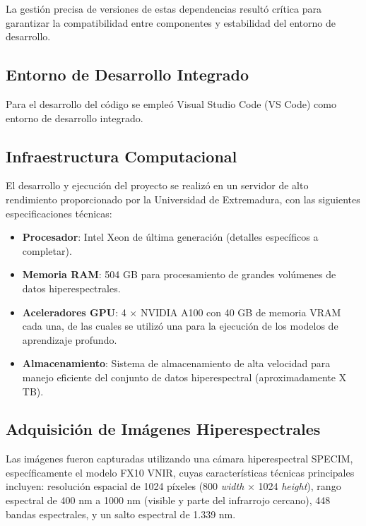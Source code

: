 La gestión precisa de versiones de estas dependencias resultó crítica para garantizar la compatibilidad entre componentes y estabilidad del entorno de desarrollo.

\subsection{Entorno de Desarrollo Integrado}

Para el desarrollo del código se empleó Visual Studio Code (VS Code) como entorno de desarrollo integrado.

\subsection{Infraestructura Computacional}

El desarrollo y ejecución del proyecto se realizó en un servidor de alto rendimiento proporcionado por la Universidad de Extremadura, con las siguientes especificaciones técnicas:

\begin{itemize}
    \item \textbf{Procesador}: Intel Xeon de última generación (detalles específicos a completar).
    \item \textbf{Memoria RAM}: 504 GB para procesamiento de grandes volúmenes de datos hiperespectrales.
    \item \textbf{Aceleradores GPU}: 4 × NVIDIA A100 con 40 GB de memoria VRAM cada una, de las cuales se utilizó una para la ejecución de los modelos de aprendizaje profundo.
    \item \textbf{Almacenamiento}: Sistema de almacenamiento de alta velocidad para manejo eficiente del conjunto de datos hiperespectral (aproximadamente X TB).
\end{itemize}

\subsection{Adquisición de Imágenes Hiperespectrales}

Las imágenes fueron capturadas utilizando una cámara hiperespectral SPECIM, específicamente el modelo FX10 VNIR, cuyas características técnicas principales incluyen: resolución espacial de 1024 píxeles (800 \emph{width} × 1024 \emph{height}), rango espectral de 400 nm a 1000 nm (visible y parte del infrarrojo cercano), 448 bandas espectrales, y un salto espectral de 1.339 nm.

\vspace{5mm}

